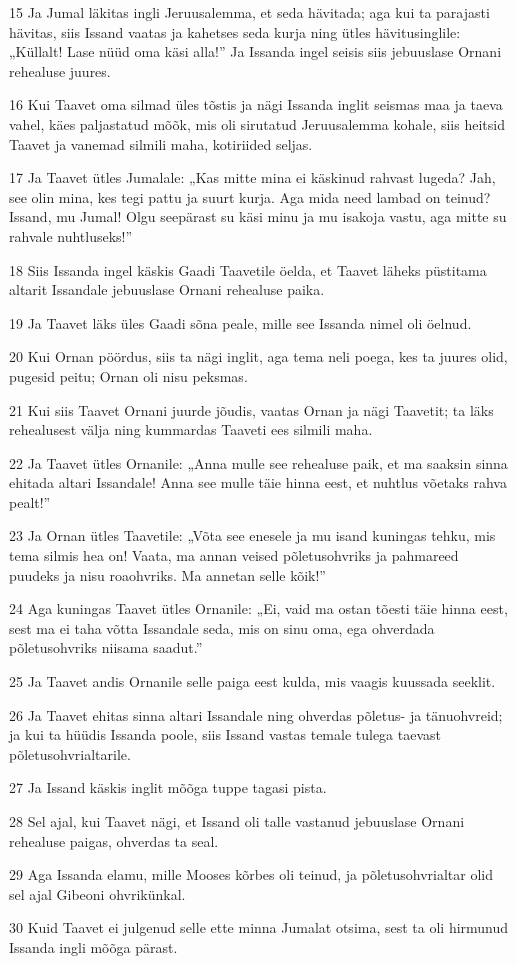 \par 15 Ja Jumal läkitas ingli Jeruusalemma, et seda hävitada; aga kui ta parajasti hävitas, siis Issand vaatas ja kahetses seda kurja ning ütles hävitusinglile: „Küllalt! Lase nüüd oma käsi alla!” Ja Issanda ingel seisis siis jebuuslase Ornani rehealuse juures.
\par 16 Kui Taavet oma silmad üles tõstis ja nägi Issanda inglit seismas maa ja taeva vahel, käes paljastatud mõõk, mis oli sirutatud Jeruusalemma kohale, siis heitsid Taavet ja vanemad silmili maha, kotiriided seljas.
\par 17 Ja Taavet ütles Jumalale: „Kas mitte mina ei käskinud rahvast lugeda? Jah, see olin mina, kes tegi pattu ja suurt kurja. Aga mida need lambad on teinud? Issand, mu Jumal! Olgu seepärast su käsi minu ja mu isakoja vastu, aga mitte su rahvale nuhtluseks!”
\par 18 Siis Issanda ingel käskis Gaadi Taavetile öelda, et Taavet läheks püstitama altarit Issandale jebuuslase Ornani rehealuse paika.
\par 19 Ja Taavet läks üles Gaadi sõna peale, mille see Issanda nimel oli öelnud.
\par 20 Kui Ornan pöördus, siis ta nägi inglit, aga tema neli poega, kes ta juures olid, pugesid peitu; Ornan oli nisu peksmas.
\par 21 Kui siis Taavet Ornani juurde jõudis, vaatas Ornan ja nägi Taavetit; ta läks rehealusest välja ning kummardas Taaveti ees silmili maha.
\par 22 Ja Taavet ütles Ornanile: „Anna mulle see rehealuse paik, et ma saaksin sinna ehitada altari Issandale! Anna see mulle täie hinna eest, et nuhtlus võetaks rahva pealt!”
\par 23 Ja Ornan ütles Taavetile: „Võta see enesele ja mu isand kuningas tehku, mis tema silmis hea on! Vaata, ma annan veised põletusohvriks ja pahmareed puudeks ja nisu roaohvriks. Ma annetan selle kõik!”
\par 24 Aga kuningas Taavet ütles Ornanile: „Ei, vaid ma ostan tõesti täie hinna eest, sest ma ei taha võtta Issandale seda, mis on sinu oma, ega ohverdada põletusohvriks niisama saadut.”
\par 25 Ja Taavet andis Ornanile selle paiga eest kulda, mis vaagis kuussada seeklit.
\par 26 Ja Taavet ehitas sinna altari Issandale ning ohverdas põletus- ja tänuohvreid; ja kui ta hüüdis Issanda poole, siis Issand vastas temale tulega taevast põletusohvrialtarile.
\par 27 Ja Issand käskis inglit mõõga tuppe tagasi pista.
\par 28 Sel ajal, kui Taavet nägi, et Issand oli talle vastanud jebuuslase Ornani rehealuse paigas, ohverdas ta seal.
\par 29 Aga Issanda elamu, mille Mooses kõrbes oli teinud, ja põletusohvrialtar olid sel ajal Gibeoni ohvrikünkal.
\par 30 Kuid Taavet ei julgenud selle ette minna Jumalat otsima, sest ta oli hirmunud Issanda ingli mõõga pärast.

